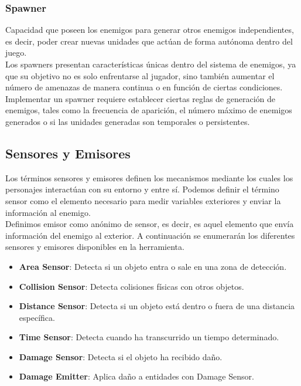 \subsubsection{Spawner}
Capacidad que poseen los enemigos para generar otros enemigos independientes, es decir, poder crear nuevas unidades que actúan de forma autónoma dentro del juego.\\
Los spawners presentan características únicas dentro del sistema de enemigos, ya que su objetivo no es solo enfrentarse al jugador, sino también aumentar el número de amenazas de manera continua o en función de ciertas condiciones.
Implementar un spawner requiere establecer ciertas reglas de generación de enemigos, tales como la frecuencia de aparición, el número máximo de enemigos generados o si las unidades generadas son temporales o persistentes.

\subsection{Sensores y Emisores}
\label{subsec:sensores y emisores}
Los términos sensores y emisores definen los mecanismos mediante los cuales los personajes interactúan con su entorno y entre sí.
Podemos definir el término sensor como el elemento necesario para medir variables exteriores y enviar la información al enemigo.\\
Definimos emisor como anónimo de sensor, es decir, es aquel elemento que envía información del enemigo al exterior.
A continuación se enumerarán los diferentes sensores y emisores disponibles en la herramienta.
\begin{itemize}
    \item \textbf{Area Sensor}: Detecta si un objeto entra o sale en una zona de detección.
    \item \textbf{Collision Sensor}: Detecta colisiones físicas con otros objetos.
    \item \textbf{Distance Sensor}: Detecta si un objeto está dentro o fuera de una distancia específica.
    \item \textbf{Time Sensor}: Detecta cuando ha transcurrido un tiempo determinado.
    \item \textbf{Damage Sensor}: Detecta si el objeto ha recibido daño.
    \item \textbf{Damage Emitter}: Aplica daño a entidades con Damage Sensor.
\end{itemize}
